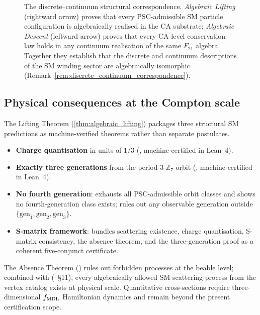 \begin{figure}[h]
{%
}
\caption{The discrete--continuum structural correspondence. \emph{Algebraic Lifting} (rightward
arrow) proves that every PSC-admissible SM particle configuration is algebraically realised
in the CA substrate; \emph{Algebraic Descent} (leftward arrow) proves that every CA-level
conservation law holds in any continuum realisation of the same $F_{21}$ algebra.
Together they establish that the discrete and continuum descriptions of the SM winding sector
are algebraically isomorphic (Remark~\ref{rem:discrete_continuum_correspondence}).}
\label{fig:discrete_continuum_correspondence}
\end{figure}

\subsection{Physical consequences at the Compton scale}
\label{sec:physical_consequences}

The Lifting Theorem (\ref{thm:algebraic_lifting}) packages three structural SM predictions as machine-verified theorems rather than separate postulates.

\begin{itemize}
\item \textbf{Charge quantisation} in units of $1/3$
(, machine-certified in Lean~4).
\item \textbf{Exactly three generations} from the period-3 $\mathbb{Z}_7$ orbit
(, machine-certified in Lean~4).
\item \textbf{No fourth generation}:  exhausts all PSC-admissible orbit classes and shows no fourth-generation class exists;  rules out any observable generation outside $\{\mathrm{gen}_1,\mathrm{gen}_2,\mathrm{gen}_3\}$.
\item \textbf{S-matrix framework}:  bundles scattering existence, charge quantisation, S-matrix consistency, the absence theorem, and the three-generation proof as a coherent five-conjunct certificate.
\end{itemize}

The Absence Theorem () rules out forbidden processes at the beable level; combined with  (~\S11), every algebraically allowed SM scattering process from the vertex catalog exists at physical scale. Quantitative cross-sections require three-dimensional $f_{\rm MDL}$ Hamiltonian dynamics and remain beyond the present certification scope.

